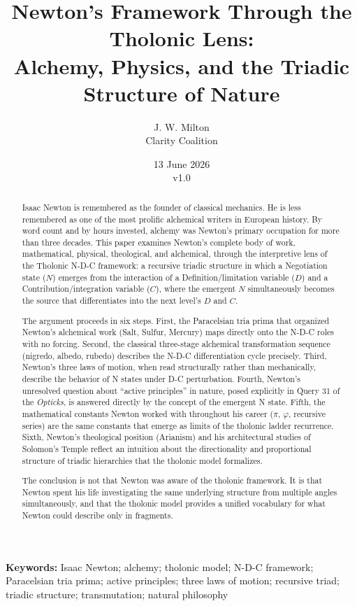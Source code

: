 \documentclass[12pt]{article}
\title{Newton's Framework Through the Tholonic Lens:\\
\large Alchemy, Physics, and the Triadic Structure of Nature}
\author{J. W. Milton\\[4pt]{\small Clarity Coalition}}
\date{\small 13 June 2026 \\ v1.0}
\begin{document}
\maketitle

\noindent\textbf{Keywords:} Isaac Newton; alchemy; tholonic model; N-D-C framework; Paracelsian tria prima; active principles; three laws of motion; recursive triad; triadic structure; transmutation; natural philosophy

\begin{abstract}
Isaac Newton is remembered as the founder of classical mechanics. He is
less remembered as one of the most prolific alchemical writers in
European history. By word count and by hours invested, alchemy was
Newton's primary occupation for more than three decades. This paper
examines Newton's complete body of work, mathematical, physical,
theological, and alchemical, through the interpretive lens of the
Tholonic N-D-C framework: a recursive triadic structure in which a
Negotiation state (\(N\)) emerges from the interaction of a
Definition/limitation variable (\(D\)) and a Contribution/integration
variable (\(C\)), where the emergent \(N\) simultaneously becomes the
source that differentiates into the next level's \(D\) and \(C\).

The argument proceeds in six steps. First, the Paracelsian tria prima
that organized Newton's alchemical work (Salt, Sulfur, Mercury) maps
directly onto the N-D-C roles with no forcing. Second, the classical
three-stage alchemical transformation sequence (nigredo, albedo, rubedo)
describes the N-D-C differentiation cycle precisely. Third, Newton's
three laws of motion, when read structurally rather than mechanically,
describe the behavior of N states under D-C perturbation. Fourth,
Newton's unresolved question about ``active principles'' in nature,
posed explicitly in Query 31 of the \emph{Opticks}, is answered directly
by the concept of the emergent N state. Fifth, the mathematical
constants Newton worked with throughout his career (\(\pi\),
\(\varphi\), recursive series) are the same constants that emerge as
limits of the tholonic ladder recurrence. Sixth, Newton's theological
position (Arianism) and his architectural studies of Solomon's Temple
reflect an intuition about the directionality and proportional structure
of triadic hierarchies that the tholonic model formalizes.

The conclusion is not that Newton was aware of the tholonic framework.
It is that Newton spent his life investigating the same underlying
structure from multiple angles simultaneously, and that the tholonic
model provides a unified vocabulary for what Newton could describe only
in fragments.
\end{abstract}
\end{document}
